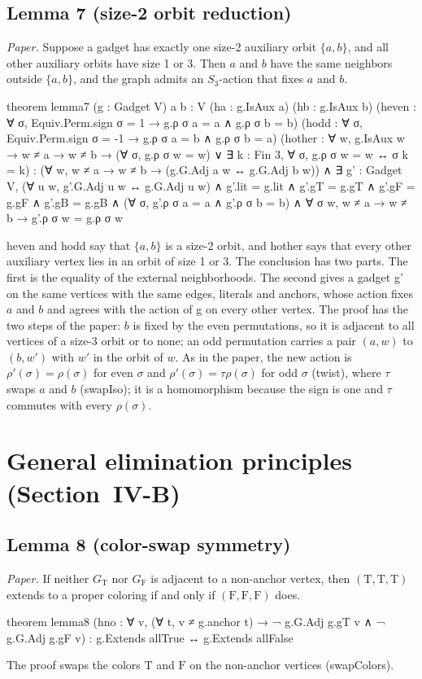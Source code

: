 \documentclass[11pt,a4paper]{article}
\newcommand{\leanus}{\textunderscore\allowbreak}
\newcommand{\lean}[1]{{\ttfamily\let\_\leanus #1}}
\newcommand{\GT}{G_{\mathrm{T}}}
\newcommand{\GF}{G_{\mathrm{F}}}
\newcommand{\T}{\mathrm{T}}
\newcommand{\F}{\mathrm{F}}
\begin{document}
\subsection{Lemma 7 (size-2 orbit reduction)}
\emph{Paper.} Suppose a gadget has exactly one size-2 auxiliary orbit
$\{a,b\}$, and all other auxiliary orbits have size 1 or 3. Then $a$ and $b$
have the same neighbors outside $\{a,b\}$, and the graph admits an
$S_3$-action that fixes $a$ and $b$.
\begin{code}
theorem lemma7 (g : Gadget V) {a b : V} (ha : g.IsAux a) (hb : g.IsAux b)
    (heven : ∀ σ, Equiv.Perm.sign σ = 1 → g.ρ σ a = a ∧ g.ρ σ b = b)
    (hodd : ∀ σ, Equiv.Perm.sign σ = -1 → g.ρ σ a = b ∧ g.ρ σ b = a)
    (hother : ∀ w, g.IsAux w → w ≠ a → w ≠ b →
      (∀ σ, g.ρ σ w = w) ∨ ∃ k : Fin 3, ∀ σ, g.ρ σ w = w ↔ σ k = k) :
    (∀ w, w ≠ a → w ≠ b → (g.G.Adj a w ↔ g.G.Adj b w)) ∧
    ∃ g' : Gadget V, (∀ u w, g'.G.Adj u w ↔ g.G.Adj u w) ∧ g'.lit = g.lit ∧
      g'.gT = g.gT ∧ g'.gF = g.gF ∧ g'.gB = g.gB ∧
      (∀ σ, g'.ρ σ a = a ∧ g'.ρ σ b = b) ∧
      ∀ σ w, w ≠ a → w ≠ b → g'.ρ σ w = g.ρ σ w
\end{code}
\lean{heven} and \lean{hodd} say that $\{a,b\}$ is a size-2 orbit, and
\lean{hother} says that every other auxiliary vertex lies in an orbit of
size 1 or 3. The conclusion has two parts. The first is the equality of the
external neighborhoods. The second gives a gadget \lean{g'} on the same
vertices with the same edges, literals and anchors, whose action fixes $a$
and $b$ and agrees with the action of \lean{g} on every other vertex. The
proof has the two steps of the paper: $b$ is fixed by the even permutations,
so it is adjacent to all vertices of a size-3 orbit or to none; an odd
permutation carries a pair $(a,w)$ to $(b,w')$ with $w'$ in the orbit of
$w$. As in the paper, the new action is $\rho'(\sigma)=\rho(\sigma)$ for even $\sigma$
and $\rho'(\sigma)=\tau\rho(\sigma)$ for odd $\sigma$ (\lean{twist}), where
$\tau$ swaps $a$ and $b$ (\lean{swapIso}); it is a homomorphism because the
sign is one and $\tau$ commutes with every $\rho(\sigma)$.

\section{General elimination principles (Section~IV-B)}\label{sec:principles}

\subsection{Lemma 8 (color-swap symmetry)}
\emph{Paper.} If neither $\GT$ nor $\GF$ is adjacent to a non-anchor vertex,
then $(\T,\T,\T)$ extends to a proper coloring if and only if $(\F,\F,\F)$
does.
\begin{code}
theorem lemma8
    (hno : ∀ v, (∀ t, v ≠ g.anchor t) → ¬ g.G.Adj g.gT v ∧ ¬ g.G.Adj g.gF v) :
    g.Extends allTrue ↔ g.Extends allFalse
\end{code}
The proof swaps the colors $\T$ and $\F$ on the non-anchor vertices
(\lean{swapColors}).
\end{document}
